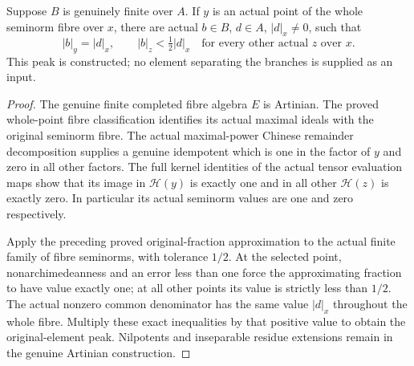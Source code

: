 \begin{lemma}
\label{spectrum:actual-finite-fibre-peak}
Suppose $B$ is genuinely finite over $A$. If $y$ is an actual point
of the whole seminorm fibre over $x$, there are actual $b\in B$,
$d\in A$, $|d|_x\ne0$, such that
\[
 |b|_y=|d|_x,
 \qquad |b|_z<\tfrac12|d|_x
 \quad\text{for every other actual }z\text{ over }x.
\]
This peak is constructed; no element separating the branches is
supplied as an input.
\leanok
\end{lemma}
\begin{proof}
The genuine finite completed fibre algebra $E$ is Artinian. The
proved whole-point fibre classification identifies its actual
maximal ideals with the original seminorm fibre. The actual
maximal-power Chinese remainder decomposition supplies a genuine
idempotent which is one in the factor of $y$ and zero in all other
factors. The full kernel identities of the actual tensor evaluation
maps show that its image in $\mathcal H(y)$ is exactly one and in
all other $\mathcal H(z)$ is exactly zero. In particular its actual
seminorm values are one and zero respectively.

Apply the preceding proved original-fraction approximation to the
actual finite family of fibre seminorms, with tolerance $1/2$.
At the selected point, nonarchimedeanness and an error less than one
force the approximating fraction to have value exactly one; at all
other points its value is strictly less than $1/2$. The actual
nonzero common denominator has the same value $|d|_x$ throughout the
whole fibre. Multiply these exact inequalities by that positive
value to obtain the original-element peak. Nilpotents and inseparable
residue extensions remain in the genuine Artinian construction.
\end{proof}


